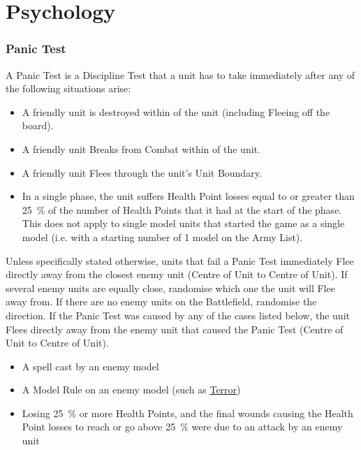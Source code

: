 
\part{Psychology}
\label{psychology}

\section{Panic Test}
\label{panic_test}

A Panic Test is a Discipline Test that a unit has to take immediately after any of the following situations arise:

\begin{itemize}
\item A friendly unit is destroyed within  of the unit (including Fleeing off the board).
\item A friendly unit Breaks from Combat within  of the unit.
\item A friendly unit Flees through the unit's Unit Boundary.
\item In a single phase, the unit suffers Health Point losses equal to or greater than \SI{25}{\percent} of the number of Health Points that it had at the start of the phase. This does not apply to single model units that started the game as a single model (i.e. with a starting number of 1 model on the Army List).
\end{itemize}

Unless specifically stated otherwise, units that fail a Panic Test immediately Flee directly away from the closest enemy unit (Centre of Unit to Centre of Unit). If several enemy units are equally close, randomise which one the unit will Flee away from. If there are no enemy units on the Battlefield, randomise the direction. If the Panic Test was caused by any of the cases listed below, the unit Flees directly away from the enemy unit that caused the Panic Test (Centre of Unit to Centre of Unit).
\begin{itemize}
\item A spell cast by an enemy model
\item A Model Rule on an enemy model (such as \hyperref[terror]{Terror})
\item Losing \SI{25}{\percent} or more Health Points, and the final wounds causing the Health Point losses to reach or go above \SI{25}{\percent} were due to an attack by an enemy unit
\end{itemize}


